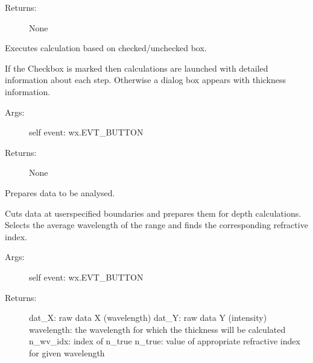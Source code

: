 \documentclass[letterpaper,10pt,english]{sphinxmanual}
\begin{document}
\begin{fulllineitems}
\begin{fulllineitems}
\begin{description}
\item[{Returns:}] \leavevmode
None

\end{description}

\end{fulllineitems}


\begin{fulllineitems}
\label{\detokenize{GUI:GUI.MyPanel.calc_choice}}
Executes calculation based on checked/unchecked box.

If the Checkbox is marked then calculations are launched with detailed 
information about each step. Otherwise a dialog box appears with thickness 
information.
\begin{description}
\item[{Args:}] \leavevmode
self
event: wx.EVT\_BUTTON

\item[{Returns:}] \leavevmode
None

\end{description}

\end{fulllineitems}


\begin{fulllineitems}
\label{\detokenize{GUI:GUI.MyPanel.data_prep}}
Prepares data to be analysed.

Cuts data at user\sphinxhyphen{}specified boundaries and prepares them for depth calculations.
Selects the average wavelength of the range and finds the corresponding refractive
index.
\begin{description}
\item[{Args:}] \leavevmode
self
event: wx.EVT\_BUTTON

\item[{Returns:}] \leavevmode
dat\_X: raw data X (wavelength)
dat\_Y: raw data Y (intensity)
wavelength: the wavelength for which the thickness will be calculated
n\_wv\_idx: index of n\_true
n\_true: value of appropriate refractive index for given wavelength


\end{description}
\end{fulllineitems}
\end{fulllineitems}
\end{document}
